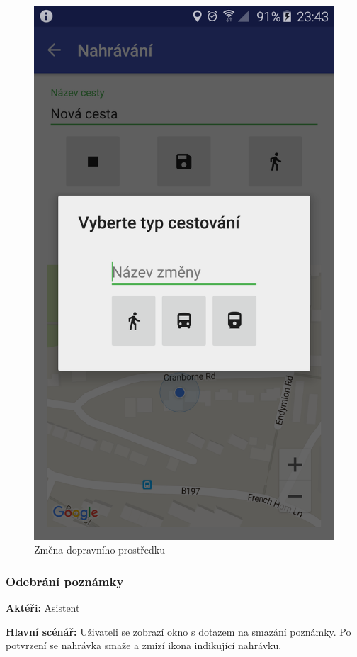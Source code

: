 \documentclass[czech,master,public,dept460,male,java,cpdeclaration]{diploma}
\newcommand{\usecase}[2]{\subsubsection{#1}\label{#2}}
\begin{document}
\begin{figure}[H]
\begin{minipage}{.5\textwidth}
                  \includegraphics[scale=0.14]{img/screen/zmenaprostredku.png}
          \caption{Změna dopravního prostředku}
          \label{fig:pridanizmenyprostredku}

       \end{minipage}
\end{figure}

\usecase{Odebrání poznámky}{odebranipoznamky}
\textbf{Aktéři:} Asistent

\vspace{0.1cm}
\noindent
\textbf{Hlavní scénář:} Uživateli se zobrazí okno s dotazem na smazání poznámky. Po potvrzení se
nahrávka smaže a zmizí ikona indikující nahrávku.
\end{document}
